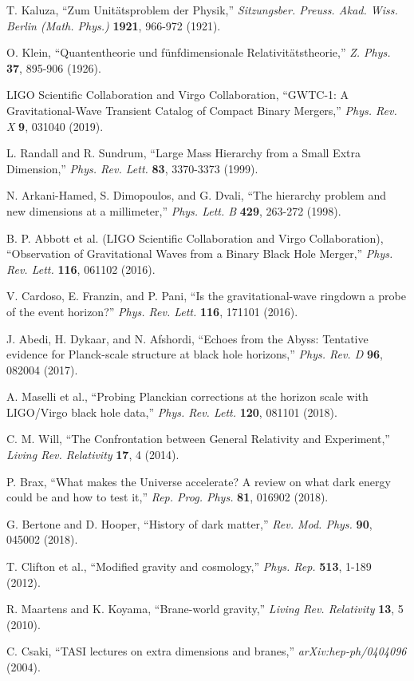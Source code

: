 \documentclass[10pt]{article}
\begin{document}
\begin{thebibliography}{99}

 T. Kaluza, ``Zum Unit\"atsproblem der Physik,'' \textit{Sitzungsber. Preuss. Akad. Wiss. Berlin (Math. Phys.)} \textbf{1921}, 966-972 (1921).

 O. Klein, ``Quantentheorie und f\"unfdimensionale Relativit\"atstheorie,'' \textit{Z. Phys.} \textbf{37}, 895-906 (1926).

 LIGO Scientific Collaboration and Virgo Collaboration, ``GWTC-1: A Gravitational-Wave Transient Catalog of Compact Binary Mergers,'' \textit{Phys. Rev. X} \textbf{9}, 031040 (2019).

 L. Randall and R. Sundrum, ``Large Mass Hierarchy from a Small Extra Dimension,'' \textit{Phys. Rev. Lett.} \textbf{83}, 3370-3373 (1999).

 N. Arkani-Hamed, S. Dimopoulos, and G. Dvali, ``The hierarchy problem and new dimensions at a millimeter,'' \textit{Phys. Lett. B} \textbf{429}, 263-272 (1998).

 B. P. Abbott et al. (LIGO Scientific Collaboration and Virgo Collaboration), ``Observation of Gravitational Waves from a Binary Black Hole Merger,'' \textit{Phys. Rev. Lett.} \textbf{116}, 061102 (2016).

 V. Cardoso, E. Franzin, and P. Pani, ``Is the gravitational-wave ringdown a probe of the event horizon?'' \textit{Phys. Rev. Lett.} \textbf{116}, 171101 (2016).

 J. Abedi, H. Dykaar, and N. Afshordi, ``Echoes from the Abyss: Tentative evidence for Planck-scale structure at black hole horizons,'' \textit{Phys. Rev. D} \textbf{96}, 082004 (2017).

 A. Maselli et al., ``Probing Planckian corrections at the horizon scale with LIGO/Virgo black hole data,'' \textit{Phys. Rev. Lett.} \textbf{120}, 081101 (2018).

 C. M. Will, ``The Confrontation between General Relativity and Experiment,'' \textit{Living Rev. Relativity} \textbf{17}, 4 (2014).

 P. Brax, ``What makes the Universe accelerate? A review on what dark energy could be and how to test it,'' \textit{Rep. Prog. Phys.} \textbf{81}, 016902 (2018).

 G. Bertone and D. Hooper, ``History of dark matter,'' \textit{Rev. Mod. Phys.} \textbf{90}, 045002 (2018).

 T. Clifton et al., ``Modified gravity and cosmology,'' \textit{Phys. Rep.} \textbf{513}, 1-189 (2012).

 R. Maartens and K. Koyama, ``Brane-world gravity,'' \textit{Living Rev. Relativity} \textbf{13}, 5 (2010).

 C. Csaki, ``TASI lectures on extra dimensions and branes,'' \textit{arXiv:hep-ph/0404096} (2004).

\end{thebibliography}
\end{document}

